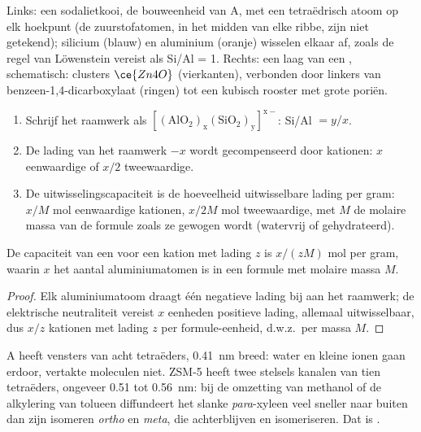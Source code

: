 \begin{omfigure}
{\small Links: een sodalietkooi, de bouweenheid van  A, met een
tetraëdrisch atoom op elk hoekpunt (de zuurstofatomen, in het midden van
elke ribbe, zijn niet getekend); silicium (blauw) en aluminium (oranje)
wisselen elkaar af, zoals de regel van Löwenstein vereist als Si/Al = 1. Rechts: een laag van een
, schematisch: clusters $\ce{Zn4O}$ (vierkanten), verbonden door
linkers van benzeen-1,4-dicarboxylaat (ringen) tot een kubisch rooster
met grote poriën.}
\end{omfigure}

\begin{method}\label{met:b3:inorganic-materials:zeolite-formula}
\begin{enumerate}
  \item Schrijf het raamwerk als $\mathrm{[(AlO_2)_x(SiO_2)_y]^{x-}}$: Si/Al $= y/x$.
  \item De lading van het raamwerk $-x$ wordt gecompenseerd door kationen: $x$ eenwaardige of $x/2$
        tweewaardige.
  \item De uitwisselingscapaciteit is de hoeveelheid uitwisselbare lading
        per gram:
        $x/M$ mol eenwaardige kationen, $x/2M$ mol tweewaardige, met $M$ de
        molaire massa van de formule zoals ze gewogen wordt (watervrij
        of gehydrateerd).
\end{enumerate}
\end{method}

\begin{proposition}[Uitwisselingscapaciteit]\label{prop:b3:inorganic-materials:exchange-capacity}
De capaciteit van een  voor een kation met lading $z$ is $x/(zM)$ mol per gram,
waarin $x$ het aantal aluminiumatomen is in een formule met molaire massa $M$.
\end{proposition}

\begin{proof}
Elk aluminiumatoom draagt één negatieve lading bij aan het raamwerk; de
elektrische neutraliteit vereist $x$ eenheden positieve lading, allemaal uitwisselbaar, dus
$x/z$ kationen met lading $z$ per formule-eenheid, d.w.z.\ per massa $M$.
\end{proof}

 A heeft vensters van acht tetraëders, \qty{0.41}{nm} breed: water
en kleine ionen gaan erdoor, vertakte moleculen niet. ZSM-5 heeft twee
stelsels kanalen van tien tetraëders, ongeveer 0.51 tot
\qty{0.56}{nm}: bij de omzetting van methanol of de alkylering van
tolueen diffundeert het slanke \textit{para}-xyleen veel sneller naar buiten dan
zijn isomeren \textit{ortho} en \textit{meta}, die achterblijven en isomeriseren. Dat is
.

